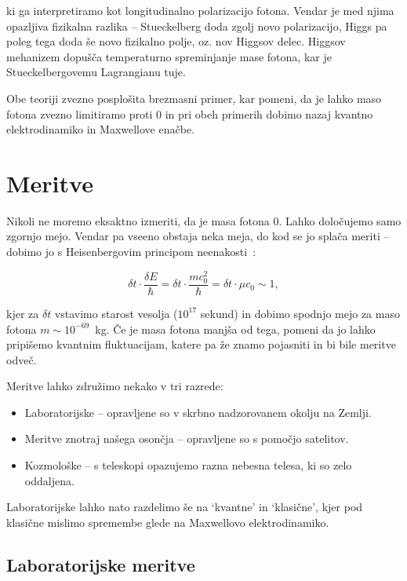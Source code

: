 \documentclass[a4paper, twocolumn, titlepage]{article}
\begin{document}
ki ga interpretiramo kot longitudinalno polarizacijo fotona. Vendar je med njima opazljiva fizikalna razlika -- Stueckelberg
doda zgolj novo polarizacijo, Higgs pa poleg tega doda še novo fizikalno polje, oz. nov Higgsov delec. Higgsov mehanizem
dopušča temperaturno spreminjanje mase fotona, kar je Stueckelbergovemu Lagrangianu tuje.

Obe teoriji zvezno posplošita brezmasni primer, kar pomeni, da je lahko maso fotona zvezno limitiramo proti 0 in pri obeh
primerih dobimo nazaj kvantno elektrodinamiko in Maxwellove enačbe.

\section{Meritve}

Nikoli ne moremo eksaktno izmeriti, da je masa fotona 0. Lahko določujemo samo zgornjo mejo. Vendar pa vseeno obstaja neka
meja, do kod se jo splača meriti -- dobimo jo s Heisenbergovim principom
neenakosti~\cite{over}:

\begin{equation}
	\delta t \cdot \frac{\delta E}{\hbar} = \delta t \cdot \frac{mc_0^2}{\hbar} = \delta t \cdot \mu c_0 \sim 1,
\end{equation}

kjer za $\delta t$ vstavimo starost vesolja ($10^{17}$ sekund) in dobimo spodnjo mejo za maso fotona \hbox{$m \sim
10^{-69}$ kg}.
\v Ce je masa fotona manj\v sa od tega, pomeni da jo lahko pripi\v semo kvantnim fluktuacijam, katere pa \v ze znamo
pojasniti in bi bile meritve odve\v c.

Meritve lahko združimo nekako v tri razrede:
\begin{itemize}
	\item{Laboratorijske -- opravljene so v skrbno nadzorovanem okolju na Zemlji.}
	\item{Meritve znotraj na\v sega oson\v cja -- opravljene so s pomočjo satelitov.}
	\item{Kozmološke -- s teleskopi opazujemo razna nebesna telesa, ki so zelo oddaljena.}
\end{itemize}

Laboratorijske lahko nato razdelimo še na `kvantne' in `klasične', kjer pod klasične mislimo spremembe glede na Maxwellovo
elektrodinamiko.

\subsection{Laboratorijske meritve}
\end{document}
